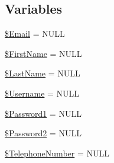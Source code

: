 \subsection*{Variables}
\begin{DoxyCompactItemize}
\item 
\hyperlink{verifyaccount_script_8php_a46da2886d0fe6510e2e0cd92aae2e79d}{\$\-Email} = N\-U\-L\-L
\item 
\hyperlink{verifyaccount_script_8php_a8316de284893b4042af91c9a454aa28e}{\$\-First\-Name} = N\-U\-L\-L
\item 
\hyperlink{verifyaccount_script_8php_a5c17c1d32727728ccc8d0b778d16c820}{\$\-Last\-Name} = N\-U\-L\-L
\item 
\hyperlink{verifyaccount_script_8php_a0e2ea0d42b9b800eb5bf8660587f5f7f}{\$\-Username} = N\-U\-L\-L
\item 
\hyperlink{verifyaccount_script_8php_a05ca62251b472fd2da8a879c9a1cc39d}{\$\-Password1} = N\-U\-L\-L
\item 
\hyperlink{verifyaccount_script_8php_affd903c17c22168d3a51e0896ba3743a}{\$\-Password2} = N\-U\-L\-L
\item 
\hyperlink{verifyaccount_script_8php_ad11bcebff6fcabeb70318242dc26eab5}{\$\-Telephone\-Number} = N\-U\-L\-L
\end{DoxyCompactItemize}


